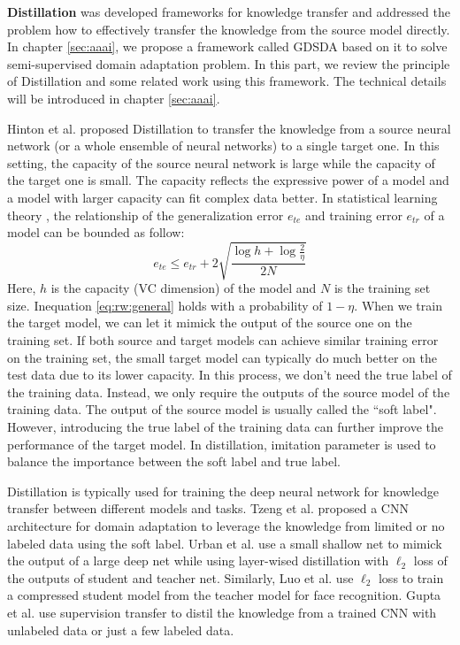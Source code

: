 \textbf{Distillation} \cite{hinton2015distilling} was developed frameworks for knowledge transfer and addressed the problem how to effectively transfer the knowledge from the source model directly. In chapter \ref{sec:aaai}, we propose a framework called GDSDA based on it to solve semi-supervised domain adaptation problem. In this part, we review the principle of Distillation and some related work using this framework. The technical details will be introduced in chapter \ref{sec:aaai}.

Hinton et al. proposed Distillation to transfer the knowledge from a source neural network (or a whole ensemble of neural networks) to a single target one. In this setting, the capacity of the source neural network is large while the capacity of the target one is small. The capacity reflects the expressive power of a model and a model with larger capacity can fit complex data better. In statistical learning theory \cite{vapnik1999overview}, the relationship of the generalization error $e_{te}$ and training error $e_{tr}$ of a model can be bounded as follow:
\begin{equation}\label{eq:rw:general}
e_{te}\leq e_{tr}+2\sqrt{\frac{\log h +\log\frac{2}{\eta}}{2N}}
\end{equation}
Here, $h$ is the capacity (VC dimension) of the model and $N$ is the training set size. Inequation \ref{eq:rw:general} holds with a probability of $1-\eta$.
When we train the target model, we can let it mimick the output of the source one on the training set. If both source and target models can achieve similar training error on the training set, the small target model can typically do much better on the test data due to its lower capacity. In this process, we don't need the true label of the training data. Instead, we only require the outputs of the source model of the training data. The output of the source model is usually called the ``soft label". However, introducing the true label of the training data can further improve the performance of the target model. In distillation, imitation parameter is used to balance the importance between the soft label and true label.

Distillation is typically used for training the deep neural network for knowledge transfer between different models and tasks. Tzeng et al. \cite{Tzeng_2015_ICCV} proposed a CNN architecture for domain adaptation to leverage the knowledge from limited or no labeled data using the soft label. Urban et al. \cite{urban2016deep} use a small shallow net to mimick the output of a large deep net while using layer-wised distillation with $\ell_2$ loss of the outputs of student and teacher net. Similarly, Luo et al. \cite{luo2016face} use $\ell_2$ loss to train a compressed student model from the teacher model for face recognition. Gupta et al. \cite{Gupta_2016_CVPR} use supervision transfer to distil the knowledge from a trained CNN with unlabeled data or just a few labeled data.

